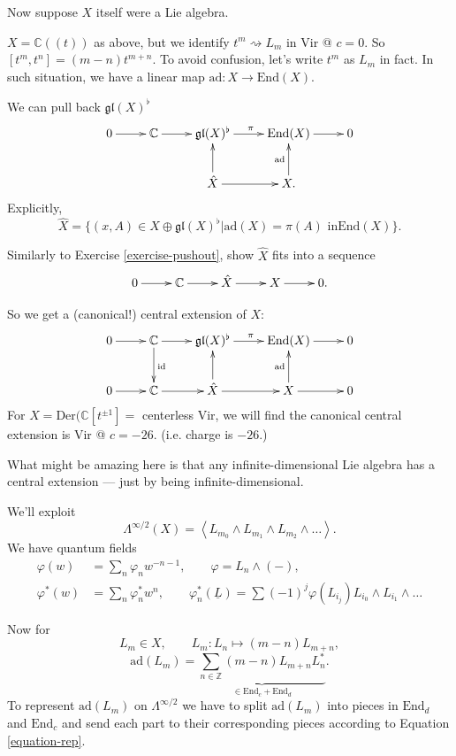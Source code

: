 \noindent
Now suppose $X$ itself were a Lie algebra.

\begin{example}
\label{example-with-X-lie-algebra}
$X=\mathbb{C}((t))$ as above, but we identify
$t^m \rightsquigarrow L_m$ in Vir @ $c=0$.
So  $[t^m,t^n]=(m-n)t^{m+n}$.
To avoid confusion, let's write $t^m$ as
$L_m$ in fact.
In such situation, we have a linear map
$\text{ad}:X \to \text{End}(X)$.

We can pull back $\mathfrak{gl}(X)^\flat$
$$
\xymatrix{
0\ar[r]&\mathbb{C}\ar[r]
&\mathfrak{gl}(X)^\flat\ar[r]^\pi
&\text{End}(X)\ar[r]&0\\
&& \hat{X}\ar[r]\ar[u]& X\ar[u]^{\text{ad}}.
}
$$
Explicitly,
$$
\hat{X}=
\{(x,A) \in X \oplus \mathfrak{gl}(X)^\flat
|\text{ad}(X)=\pi(A) \text{ in
}\text{End}(X)\}.
$$
\end{example}

\begin{exercise}
\label{exercise-pushout2}
Similarly to Exercise \ref{exercise-pushout},
show $\hat{X}$ fits into a sequence
$$
\xymatrix{
0\ar[r]&\mathbb{C}\ar[r]&\hat{X}\ar[r]&
X\ar[r]&0.
}
$$
\end{exercise}
So we get a (canonical!) central extension of
$X$:
$$
\xymatrix{
0\ar[r]&\mathbb{C}\ar[d]^{\text{id}}\ar[r]
&\mathfrak{gl}(X)^\flat\ar[r]^\pi
&\text{End}(X)\ar[r]&0\\
0\ar[r]&\mathbb{C}\ar[r]&\hat{X}\ar[u]\ar[r]&
X\ar[u]^{\text{ad}}\ar[r]&0
}
$$
For $X=\text{Der}(\mathbb{C}[t^{\pm 1}]=$
centerless Vir,
we will find the canonical central extension
is
Vir  @ $c=-26$. (i.e. charge is  $-26$.)

\noindent
What might be amazing here is that any
infinite-dimensional
Lie algebra has a central extension --- just
by being infinite-dimensional.

\medskip\noindent
We'll exploit
$$
\Lambda^{\infty/2}(X)
=\left\langle{}L_{m_0}\wedge L_{m_1}\wedge
L_{m_2}\wedge\ldots\right\rangle{}.
$$
We have quantum fields
$$
\begin{aligned}
\varphi(w)&=\sum_n\varphi_nw^{-n-1},\qquad
\varphi=L_n \wedge(-),\\
\varphi^* (w)&=\sum_n \varphi_n^* w^n,\qquad
\varphi_n^* (\underline{L})=
\sum(-1)^j\varphi(L_{i_j})L_{i_0}\wedge
L_{i_1}\wedge\ldots
\end{aligned}
$$

\noindent
Now for
$$
L_m \in X,\qquad  L_m :L_n \mapsto
(m-n)L_{m+n},
$$
$$
\text{ad}(L_m)=\underbrace{\sum_{n \in
\mathbb{Z}}(m-n) L_{m+n}L_n^*}
_{\in \text{End}_c + \text{End}_d}.
$$
To represent $\text{ad}(L_m)$ on
$\Lambda^{\infty/2}$
we have to split $\text{ad}(L_m)$ into pieces
in $\text{End}_d$ and $\text{End}_c$ and
send each part to their corresponding pieces
according to Equation \ref{equation-rep}.

